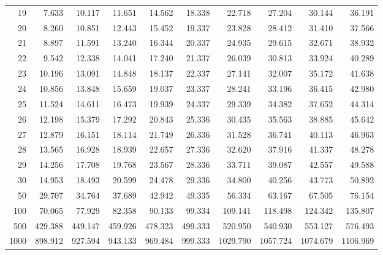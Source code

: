 \begin{minipage}{\textwidth}
\begin{center}
\begin{tabular}{|r|rrr|rrr|rrr|}
19&7.633&10.117&11.651&14.562&18.338&22.718&27.204&30.144&36.191\\
20&8.260&10.851&12.443&15.452&19.337&23.828&28.412&31.410&37.566\\
\rowcolor[gray]{.9}
21&8.897&11.591&13.240&16.344&20.337&24.935&29.615&32.671&38.932\\
22&9.542&12.338&14.041&17.240&21.337&26.039&30.813&33.924&40.289\\
\rowcolor[gray]{.9}
23&10.196&13.091&14.848&18.137&22.337&27.141&32.007&35.172&41.638\\
24&10.856&13.848&15.659&19.037&23.337&28.241&33.196&36.415&42.980\\
\rowcolor[gray]{.9}
25&11.524&14.611&16.473&19.939&24.337&29.339&34.382&37.652&44.314\\
26&12.198&15.379&17.292&20.843&25.336&30.435&35.563&38.885&45.642\\
\rowcolor[gray]{.9}
27&12.879&16.151&18.114&21.749&26.336&31.528&36.741&40.113&46.963\\
28&13.565&16.928&18.939&22.657&27.336&32.620&37.916&41.337&48.278\\
\rowcolor[gray]{.9}
29&14.256&17.708&19.768&23.567&28.336&33.711&39.087&42.557&49.588\\
30&14.953&18.493&20.599&24.478&29.336&34.800&40.256&43.773&50.892\\
\rowcolor[gray]{.9}
50&29.707&34.764&37.689&42.942&49.335&56.334&63.167&67.505&76.154\\
100&70.065&77.929&82.358&90.133&99.334&109.141&118.498&124.342&135.807\\
\rowcolor[gray]{.9}
500&429.388&449.147&459.926&478.323&499.333&520.950&540.930&553.127&576.493\\
1000&898.912&927.594&943.133&969.484&999.333&1029.790&1057.724&1074.679&1106.969\\
\hline
\end{tabular}
\end{center}
    \end{minipage}
\renewcommand{\arraystretch}{\arraystretchOriginal}
